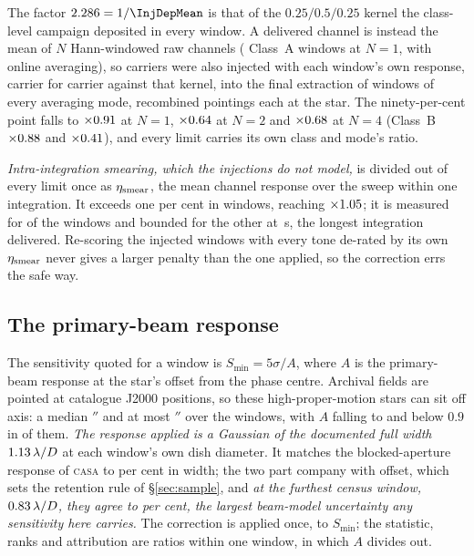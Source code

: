 The factor $\RpRespFac=1/\InjDepMean$ is that of the $0.25/0.5/0.25$
kernel the class-level campaign deposited in every window. A delivered channel
is instead the mean of $N$ Hann-windowed raw channels (\SvNWinNOne{} Class~A
windows at $N=1$, \SvNWinNAvg{} with online averaging), so carriers were also
injected with each window's own response, carrier for carrier against that
kernel, into the final extraction of \IjNWin{} windows of every averaging mode,
recombined pointings each at the star. The ninety-per-cent point falls to
$\times0.91$ at $N=1$, $\times0.64$ at $N=2$ and
$\times0.68$ at $N=4$ (Class~B $\times0.88$ and
$\times0.41$), and every limit carries its own class and mode's ratio.

\emph{Intra-integration smearing, which the injections do not model,} is
divided out of every limit once as $\eta_{\rm smear}$, the mean channel
response over the sweep within one integration. It exceeds one per cent in
\NmRespNApplied{} windows, reaching $\times1.05$; it is measured for
\SmcNMeas{} of the \NWindows{} windows and bounded for the other \SmcNBound{}
at \SmcDtCeil\,s, the longest integration delivered. Re-scoring the
\SmcValNWin{} injected windows with every tone de-rated by its own
$\eta_{\rm smear}$ never gives a larger penalty than the one applied, so the
correction errs the safe way.

\subsection{The primary-beam response}
\label{app:pbresp}

The sensitivity quoted for a window is $S_{\min}=5\sigma/A$, where $A$ is the
primary-beam response at the star's offset from the phase centre. Archival
fields are pointed at catalogue J2000 positions, so these high-proper-motion
stars can sit off axis: a median \PbOffMed$''$ and at most \BmOffMax$''$ over
the \PbNWin{} windows, with $A$ falling to \BmRespMin{} and below $0.9$ in
\BmNBelowNine{} of them. \emph{The response applied is a Gaussian of the documented full
width} $1.13\,\lambda/D$ \citep{ALMAHandbook} at each window's own dish
diameter. It matches the blocked-aperture response of \textsc{casa}
\citep{CASA2022} to \BmDocAiryPct{} per cent in width; the two part company
with offset, which sets the retention rule of \S\ref{sec:sample}, and
\emph{at the furthest census window, $0.83\,\lambda/D$, they agree
to \BmCensusWorstPct{} per cent, the largest beam-model uncertainty any
sensitivity here carries.} The correction is applied once, to $S_{\min}$; the
statistic, ranks and attribution are ratios within one window, in which $A$
divides out.


